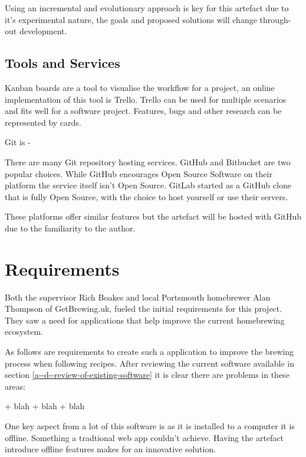 Using an incremental and evolutionary approach is key for this artefact due to it's experimental nature, the goals and proposed solutions will change through-out development.

\subsection{Tools and Services} \label{a-d--methodology--tools}

Kanban boards are a tool to visualise the workflow for a project, an online implementation of this tool is Trello. Trello can be used for multiple scenarios and fits well for a software project. Features, bugs and other research can be represented by cards. \cite{trello}

Git is -

There are many Git repository hosting services. GitHub and Bitbucket are two popular choices. While GitHub encourages Open Source Software on their platform the service itself isn't Open Source. \cite{github} GitLab started as a GitHub clone that is fully Open Source, with the choice to host yourself or use their servers. %

These platforms offer similar features but the artefact will be hosted with GitHub due to the familiarity to the author.


\section{Requirements} \label{a-d--requirements}

Both the supervisor Rich Boakes and local Portsmouth homebrewer Alan Thompson of GetBrewing.uk, fueled the initial requirements for this project. They saw a need for applications that help improve the current homebrewing ecosystem.

As follows are requirements to create such a application to improve the brewing process when following recipes. After reviewing the current software available in section \ref{a--d--review-of-existing-software} it is clear there are problems in these areas:

+ blah
+ blah
+ blah

One key aspect from a lot of this software is as it is installed to a computer it is offline. Something a tradtional web app couldn't achieve. Having the artefact introduce offline features makes for an innovative solution.

